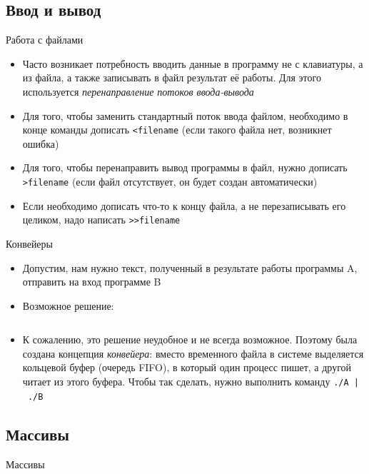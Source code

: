 \documentclass{beamer}
\begin{document}
\subsection{Ввод и вывод}
\begin{frame}{Работа с файлами}
	\begin{itemize}
		\item{Часто возникает потребность вводить данные в программу не с клавиатуры, а из файла, а также записывать в файл результат её работы. Для этого используется \emph{перенаправление потоков ввода-вывода}}\pause
		\item{Для того, чтобы заменить стандартный поток ввода файлом, необходимо в конце команды дописать \texttt{<filename} (если такого файла нет, возникнет ошибка)}\pause
		\item{Для того, чтобы перенаправить вывод программы в файл, нужно дописать \texttt{>filename} (если файл отсутствует, он будет создан автоматически)}\pause
		\item{Если необходимо дописать что-то к концу файла, а не перезаписывать его целиком, надо написать \texttt{>{}>filename}}
	\end{itemize}
\end{frame}

\begin{frame}{Конвейеры}
	\begin{itemize}
		\item{Допустим, нам нужно текст, полученный в результате работы программы A, отправить на вход программе B}\pause
		\item{Возможное решение:}
	\end{itemize}
	\vspace*{-\baselineskip}
	\inputminted[linenos,bgcolor=listing]{bash}{files/unix_quickstart/nopipe.sh}\pause
	\vspace*{-\baselineskip}
	\begin{itemize}
		\item{К сожалению, это решение неудобное и не всегда возможное. Поэтому была создана концепция \emph{конвейера}: вместо временного файла в системе выделяется кольцевой буфер (очередь FIFO), в который один процесс пишет, а другой читает из этого буфера. Чтобы так сделать, нужно выполнить команду \texttt{./A~|~./B}}
	\end{itemize}
\end{frame}

\subsection{Массивы}
\begin{frame}{Массивы}
	\inputminted[linenos,bgcolor=listing]{bash}{files/unix_quickstart/arrays.sh}
\end{frame}
\end{document}

